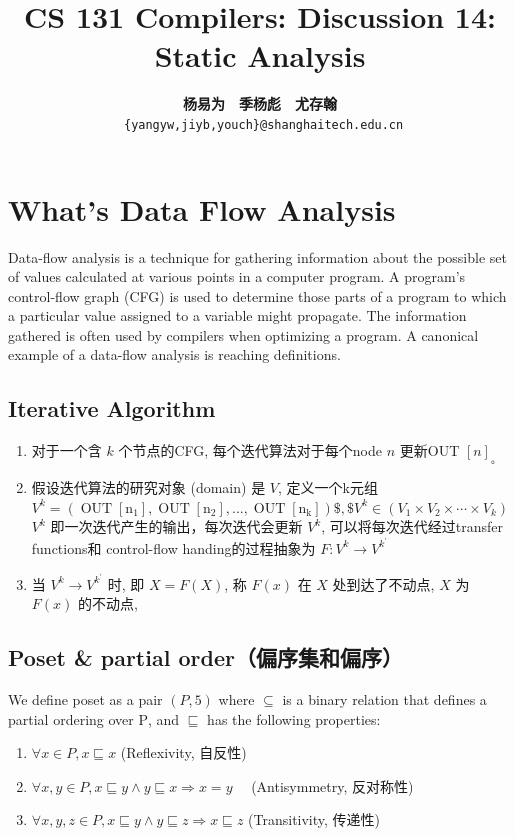 \documentclass[a4paper]{article}
\title{CS 131 Compilers: Discussion 14: Static Analysis}
\author{\textbf{杨易为}~~\textbf{季杨彪}~~\textbf{尤存翰} \\ \texttt{ \{yangyw,jiyb,youch\}@shanghaitech.edu.cn}}
\theoremstyle{definition}
\begin{document}
\maketitle
\section{What's Data Flow Analysis}
Data-flow analysis is a technique for gathering information about the possible set of values calculated at various points in a computer program. A program's control-flow graph (CFG) is used to determine those parts of a program to which a particular value assigned to a variable might propagate. The information gathered is often used by compilers when optimizing a program. A canonical example of a data-flow analysis is reaching definitions.
\subsection{Iterative Algorithm}
\begin{enumerate}
  \item 对于一个含 $k$ 个节点的CFG, 每个迭代算法对于每个node $n$ 更新OUT $[n]_{\text {。 }}$
  \item 假设迭代算法的研究对象 (domain) 是 $V$, 定义一个k元组
  $V^{k}=\left(\operatorname{OUT}\left[\mathrm{n}_{1}\right], \operatorname{OUT}\left[\mathrm{n}_{2}\right], \ldots, \operatorname{OUT}\left[\mathrm{n}_{\mathrm{k}}\right]\right) \$, \$ V^{k} \in\left(V_{1} \times V_{2} \times \cdots \times V_{k}\right)$
  $V^{k}$ 即一次迭代产生的输出，每次迭代会更新 $V^{k}$, 可以将每次迭代经过transfer functions和 control-flow handing的过程抽象为 $F: V^{k} \rightarrow V^{k^{\prime}}$
  \item 当 $V^{k} \rightarrow V^{k^{\prime}}$ 时,
  即 $X=F(X)$, 称 $F(x)$ 在 $X$ 处到达了不动点, $X$ 为 $F(x)$ 的不动点,
\end{enumerate}

\subsection{Poset \& partial order（偏序集和偏序）}
We define poset as a pair $(P, 5)$ where $\subseteq$ is a binary relation that defines a partial ordering
over $\mathrm{P}$, and $\sqsubseteq$ has the following properties:
\begin{enumerate}
 \item $\forall x \in P, x \sqsubseteq x$ (Reflexivity, 自反性)
 \item $\forall x, y \in P, x \sqsubseteq y \wedge y \sqsubseteq x \Rightarrow x=y \quad$ (Antisymmetry, 反对称性)
 \item $\forall x, y, z \in P, x \sqsubseteq y \wedge y \sqsubseteq z \Rightarrow x \sqsubseteq z$ (Transitivity, 传递性)
\end{enumerate}
\end{document}
